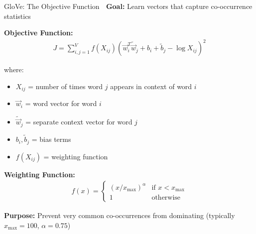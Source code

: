 \documentclass[aspectratio=169]{beamer}
\begin{document}
\begin{frame}{GloVe: The Objective Function 🎯}
\textbf{Goal:} Learn vectors that capture co-occurrence statistics

\vspace{1em}

\textbf{Objective Function:}
\begin{align*}
J = \sum_{i,j=1}^{V} f(X_{ij}) \left(\vec{w}_i^T \tilde{\vec{w}}_j + b_i + \tilde{b}_j - \log X_{ij}\right)^2
\end{align*}

where:
\begin{itemize}\setlength{\itemsep}{0pt}
    \item $X_{ij}$ = number of times word $j$ appears in context of word $i$
    \item $\vec{w}_i$ = word vector for word $i$
    \item $\tilde{\vec{w}}_j$ = separate context vector for word $j$
    \item $b_i, \tilde{b}_j$ = bias terms
    \item $f(X_{ij})$ = weighting function
\end{itemize}

\vspace{1em}

\textbf{Weighting Function:}
\begin{align*}
f(x) = \begin{cases}
(x/x_{\max})^\alpha & \text{if } x < x_{\max} \\
1 & \text{otherwise}
\end{cases}
\end{align*}

\textbf{Purpose:} Prevent very common co-occurrences from dominating (typically $x_{\max}=100$, $\alpha=0.75$)
\end{frame}
\end{document}
